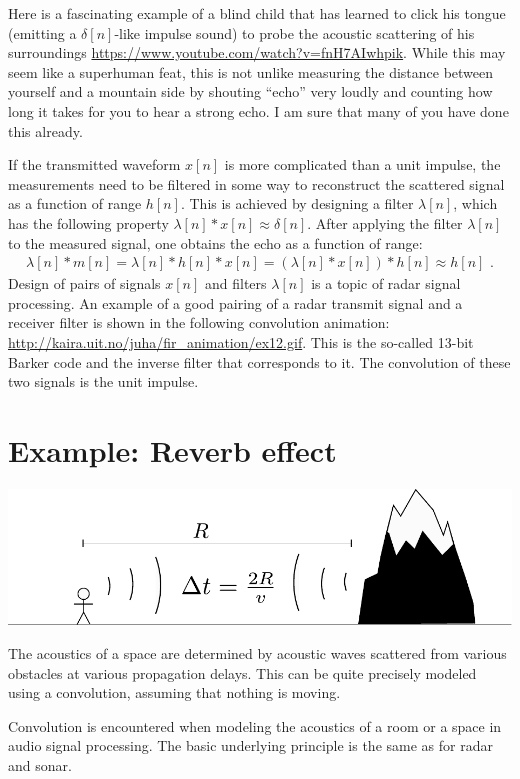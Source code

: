 Here is a fascinating example of a blind child that has learned to
click his tongue (emitting a $\delta[n]$-like impulse sound) to probe the
acoustic scattering of his
surroundings \url{https://www.youtube.com/watch?v=fnH7AIwhpik}. While
this may seem like a superhuman feat, this is not unlike measuring the
distance between yourself and a mountain side by shouting ``echo''
very loudly and counting how long it takes for you to hear a strong
echo. I am sure that many of you have done this already.

If the transmitted waveform $x[n]$ is more complicated than a unit
impulse, the measurements need to be filtered in some way to
reconstruct the scattered signal as a function of range $h[n]$. This
is achieved by designing a filter $\lambda[n]$, which has the
following property $\lambda[n]*x[n] \approx \delta[n]$. After applying
the filter $\lambda[n]$ to the measured signal, one obtains the echo
as a function of range:
\begin{align}
\lambda[n]*m[n] = \lambda[n]*h[n]*x[n] = (\lambda[n]*x[n])*h[n]\approx h[n]\,\,. 
\end{align}
Design of pairs of signals $x[n]$ and filters $\lambda[n]$ is a topic
of radar signal processing. An example of a good pairing of a radar
transmit signal and a receiver filter is shown in the following convolution animation:
\url{http://kaira.uit.no/juha/fir_animation/ex12.gif}.
This is the so-called 13-bit Barker code and the inverse filter that
corresponds to it. The convolution of these two signals is the unit
impulse.


\section{Example: Reverb effect}
\label{reverb_section}

\begin{marginfigure}
\begin{center}
\includegraphics[width=\textwidth]{ch10/figures/mountain_echo.pdf}
\end{center}
\caption{The acoustics of a space are determined by acoustic waves
scattered from various obstacles at various propagation delays. This
can be quite precisely modeled using a convolution, assuming that
nothing is moving.}
\end{marginfigure}
Convolution is encountered when modeling the acoustics of a room or a
space in audio signal processing. The basic underlying principle is
the same as for radar and sonar.

